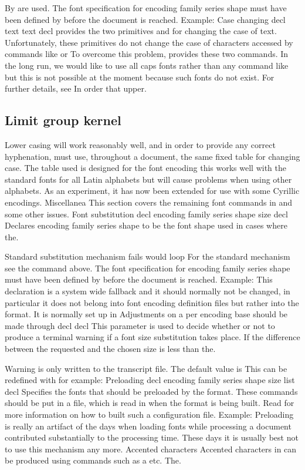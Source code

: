 \documentclass{article}
\begin{document}
By are used. The font specification for encoding family series shape must have been defined by before the document is reached. Example: Case changing decl text text decl provides the two primitives and for changing the case of text. Unfortunately, these primitives do not change the case of characters accessed by commands like or To overcome this problem, provides these two commands. In the long run, we would like to use all caps fonts rather than any command like but this is not possible at the moment because such fonts do not exist. For further details, see In order that upper.

\subsection{Limit group kernel}
Lower casing will work reasonably well, and in order to provide any correct hyphenation, must use, throughout a document, the same fixed table for changing case. The table used is designed for the font encoding this works well with the standard fonts for all Latin alphabets but will cause problems when using other alphabets. As an experiment, it has now been extended for use with some Cyrillic encodings. Miscellanea This section covers the remaining font commands in and some other issues. Font substitution decl encoding family series shape size decl Declares encoding family series shape to be the font shape used in cases where the.

Standard substitution mechanism fails would loop For the standard mechanism see the command above. The font specification for encoding family series shape must have been defined by before the document is reached. Example: This declaration is a system wide fallback and it should normally not be changed, in particular it does not belong into font encoding definition files but rather into the format. It is normally set up in Adjustments on a per encoding base should be made through decl decl This parameter is used to decide whether or not to produce a terminal warning if a font size substitution takes place. If the difference between the requested and the chosen size is less than the.

Warning is only written to the transcript file. The default value is This can be redefined with for example: Preloading decl encoding family series shape size list decl Specifies the fonts that should be preloaded by the format. These commands should be put in a file, which is read in when the format is being built. Read for more information on how to built such a configuration file. Example: Preloading is really an artifact of the days when loading fonts while processing a document contributed substantially to the processing time. These days it is usually best not to use this mechanism any more. Accented characters Accented characters in can be produced using commands such as a etc. The.
\end{document}
